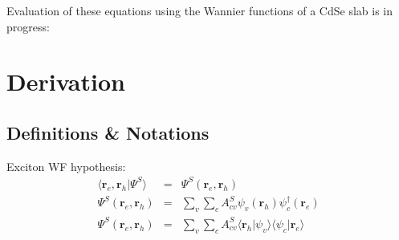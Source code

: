 \documentclass[book]{revtex4}
\begin{document}

Evaluation of these equations using the Wannier functions of a CdSe slab is in progress: 



\section{Derivation}
\subsection{Definitions \& Notations}

Exciton WF hypothesis: 
\begin{eqnarray*}
\langle  \mathbf{r}_e, \mathbf{r}_h  \vert \Psi^S \rangle &=&  \Psi^S \left(  \mathbf{r}_e, \mathbf{r}_h \right) \\
\Psi^S \left(  \mathbf{r}_e, \mathbf{r}_h \right) &=& \sum_v \sum_c A^S_{cv} \psi_v  \left(  \mathbf{r}_h \right)  \psi^\dagger_c  \left(    \mathbf{r}_e \right) \\
\Psi^S \left(  \mathbf{r}_e, \mathbf{r}_h \right) &=& \sum_v \sum_c A^S_{cv} \langle   \mathbf{r}_h   \vert \psi_v   \rangle \langle \psi_c \vert    \mathbf{r}_e \rangle
\end{eqnarray*}
\end{document}
